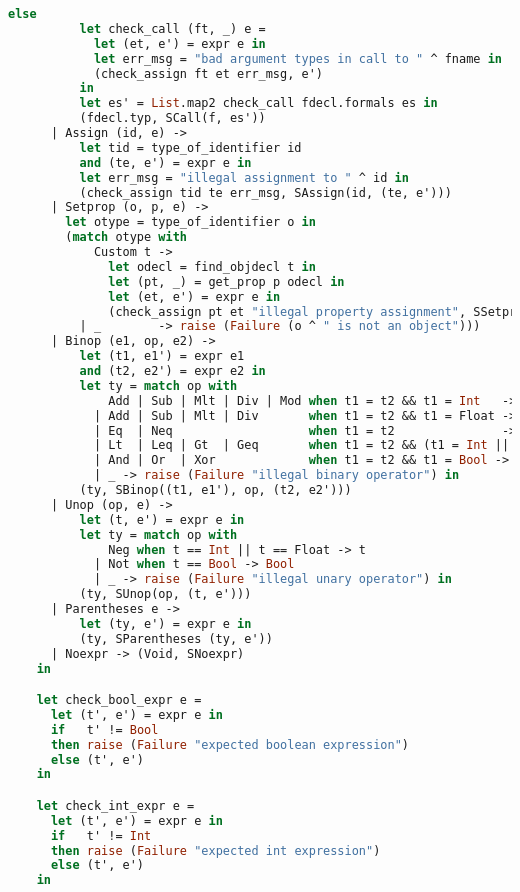 \begin{lstlisting}[language=Caml,backgroundcolor=\color{backgroundcolor}]
          else
          let check_call (ft, _) e =
            let (et, e') = expr e in
            let err_msg = "bad argument types in call to " ^ fname in
            (check_assign ft et err_msg, e')
          in
          let es' = List.map2 check_call fdecl.formals es in
          (fdecl.typ, SCall(f, es'))
      | Assign (id, e) ->
          let tid = type_of_identifier id
          and (te, e') = expr e in
          let err_msg = "illegal assignment to " ^ id in
          (check_assign tid te err_msg, SAssign(id, (te, e')))
      | Setprop (o, p, e) ->
        let otype = type_of_identifier o in
        (match otype with
            Custom t ->
              let odecl = find_objdecl t in
              let (pt, _) = get_prop p odecl in
              let (et, e') = expr e in
              (check_assign pt et "illegal property assignment", SSetprop(o, p, (et, e')))
          | _        -> raise (Failure (o ^ " is not an object")))
      | Binop (e1, op, e2) ->
          let (t1, e1') = expr e1
          and (t2, e2') = expr e2 in
          let ty = match op with
              Add | Sub | Mlt | Div | Mod when t1 = t2 && t1 = Int   -> Int
            | Add | Sub | Mlt | Div       when t1 = t2 && t1 = Float -> Float
            | Eq  | Neq                   when t1 = t2               -> Bool
            | Lt  | Leq | Gt  | Geq       when t1 = t2 && (t1 = Int || t2 = Float) -> Bool
            | And | Or  | Xor             when t1 = t2 && t1 = Bool -> Bool
            | _ -> raise (Failure "illegal binary operator") in
          (ty, SBinop((t1, e1'), op, (t2, e2')))
      | Unop (op, e) ->
          let (t, e') = expr e in
          let ty = match op with
              Neg when t == Int || t == Float -> t
            | Not when t == Bool -> Bool
            | _ -> raise (Failure "illegal unary operator") in
          (ty, SUnop(op, (t, e')))
      | Parentheses e ->
          let (ty, e') = expr e in
          (ty, SParentheses (ty, e'))
      | Noexpr -> (Void, SNoexpr)
    in

    let check_bool_expr e =
      let (t', e') = expr e in
      if   t' != Bool
      then raise (Failure "expected boolean expression")
      else (t', e')
    in

    let check_int_expr e =
      let (t', e') = expr e in
      if   t' != Int
      then raise (Failure "expected int expression")
      else (t', e')
    in


\end{lstlisting}
